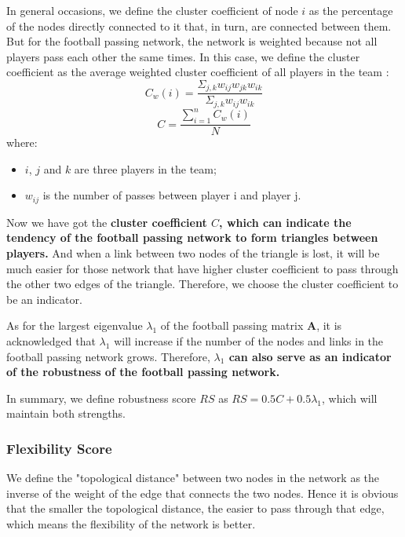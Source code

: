 \documentclass{mcmthesis}
\begin{document}
	In general occasions, we define the cluster coefficient of node $i$ as the percentage of the nodes directly connected to it that, in turn, are connected between them.  But for the football passing network, the network is weighted because not all players pass each other the same times.  In this case, we define the cluster coefficient as the average weighted cluster coefficient of all players in the team :
	\begin{equation}\label{eq:cwi}
		C_{w}(i) = \frac{\Sigma_{j,k}w_{ij}w_{jk}w_{ik}}{\Sigma_{j,k}w_{ij}w_{ik}}
	\end{equation}
	\begin{equation}\label{eq:c}
		C = \frac{\sum_{i=1}^n C_{w}(i)}{N}
	\end{equation}
	where:
	\begin{itemize}
	\item $i$, $j$ and $k$ are three players in the team;
	\item 	$w_{ij}$ is the number of passes between player i and player j.
	\end{itemize}	
	
	Now we have got the \textbf{cluster coefficient $C$, which can indicate the tendency of the football passing network to form triangles between players.}  And when a link between two nodes of the triangle is lost, it will be much easier for those network that have higher cluster coefficient to pass through the other two edges of the triangle.  Therefore, we choose the cluster coefficient to be an indicator.

	As for the largest eigenvalue $\lambda_{1}$ of the football passing matrix $\textbf{A}$, it is acknowledged that $\lambda_{1}$ will increase if the number of the nodes and links in the football passing network grows.  Therefore, \textbf{$\lambda_{1}$ can also serve as an indicator of the robustness of the football passing network.}

	In summary, we define robustness score $RS$ as $RS = 0.5C + 0.5\lambda_{1}$, which will maintain both strengths.
\subsubsection{Flexibility Score}
	We define the "topological distance" between two nodes in the network as the inverse of the weight of the edge that connects the two nodes. Hence it is obvious that the smaller the topological distance, the easier to pass through that edge, which means the flexibility of the network is better. 
	
\end{document}
